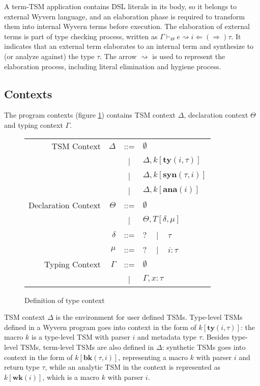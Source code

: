\documentclass{sig-alternate}
\newcommand{\mycaption}[1]{\vspace{-4px}\caption{#1}\vspace{-2px}}
\begin{document}
A term-TSM application contains DSL literals in its body, so it belongs to external Wyvern language, and an elaboration phase is required to transform them into internal Wyvern terms before execution. The elaboration of external terms is part of type checking process, written as $\Gamma\vdash_{\Theta} e\rightsquigarrow i \Leftarrow(\Rightarrow) \tau$. It indicates that an external term elaborates to an internal term and synthesize to (or analyze against) the type $\tau$. The arrow $\rightsquigarrow$ is used to represent the elaboration process, including literal elimination and hygiene process.

\subsection{Contexts}
The program contexts (figure \ref{typechecking-environment}) contains TSM context $\Delta$, declaration context $\Theta$ and typing context $\Gamma$. 

\begin{figure}[ht]
\begin{center}
\begin{tabular}{r r c l}
TSM Context       & $\Delta$  & ::=   & $\emptyset$\\
                      &           &   |   & $\Delta,k[\mathbf{ty}(i,\tau)]$\\
                      &           &   |   & $\Delta,k[\mathbf{syn}(\tau,i)]$\\
                      &           &   |   & $\Delta,k[\mathbf{ana}(i)]$\\
Declaration Context   & $\Theta$  & ::=   & $\emptyset$\\
                      &           &   |   & $\Theta,T[\delta,\mu]$\\
                      & $\delta$  &  ::=  & $?$ ~ | ~ $\tau$\\
                      & $\mu$     &  ::=  & $?$ ~ | ~ $i:\tau$\\
Typing Context        & $\Gamma$  &  ::=  & $\emptyset$\\
                      &           &   |   & $\Gamma,x:\tau$
\end{tabular}
\end{center}
\mycaption{Definition of type context}
\label{typechecking-environment}
\end{figure}

TSM context $\Delta$ is the environment for user defined TSMs. Type-level TSMs defined in a Wyvern program goes into context in the form of $k[\mathbf{ty}(i,\tau)]$: the macro $k$ is a type-level TSM with parser $i$ and metadata type $\tau$. Besides type-level TSMs, term-level TSMs are also defined in $\Delta$: synthetic TSMs goes into context in the form of $k[\mathbf{bk}(\tau,i)]$, representing a macro $k$ with parser $i$ and return type $\tau$, while an analytic TSM in the context is represented as $k[\mathbf{wk}(i)]$, which is a macro $k$ with parser $i$.
\end{document}
